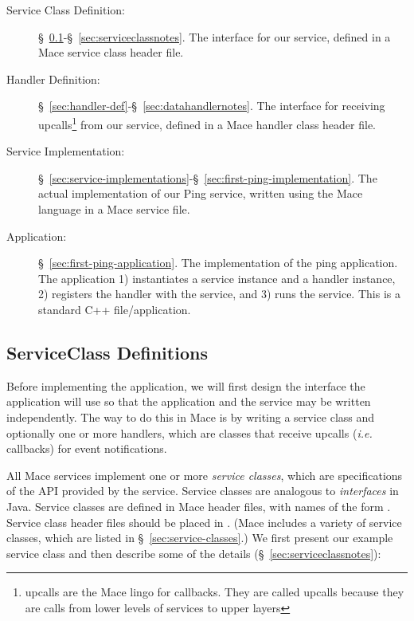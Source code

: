 \begin{description}

\item[Service Class Definition: ]
  \S~\ref{sec:serviceclass-def}-\S~\ref{sec:serviceclassnotes}.
  The interface for our service, defined in a Mace service class
  header file.

\item[Handler Definition: ]
  \S~\ref{sec:handler-def}-\S~\ref{sec:datahandlernotes}.  The interface for
  receiving upcalls\footnote{upcalls are the Mace lingo for callbacks.  They
  are called upcalls because they are calls from lower levels of services to
  upper layers} from our service, defined in a Mace handler class header file.

\item[Service Implementation: ]
  \S~\ref{sec:service-implementations}-\S~\ref{sec:first-ping-implementation}.
  The actual implementation of our Ping service, written using the
  Mace language in a Mace service file.

\item[Application: ]
  \S~\ref{sec:first-ping-application}.  The implementation of the ping
  application.  The application 1) instantiates a service instance and
  a handler instance, 2) registers the handler with the service, and
  3) runs the service.  This is a standard C++ file/application.

\end{description}


\subsection{ServiceClass Definitions}
\label{sec:serviceclass-def}

Before implementing the application, we will first design the interface the
application will use so that the application and the service may be written
independently.  The way to do this in Mace is by writing a service class and
optionally one or more handlers, which are classes that receive upcalls
(\emph{i.e.} callbacks) for event notifications.

All Mace services implement one or more \emph{service classes}, which
are specifications of the API provided by the service.  Service
classes are analogous to \emph{interfaces} in Java.  Service classes
are defined in Mace header files, with names of the form
.  Service class
header files should be placed in .  (Mace
includes a variety of service classes, which are listed in
\S~\ref{sec:service-classes}.)  We first present our example service
class and then describe some of the details
(\S~\ref{sec:serviceclassnotes}):


